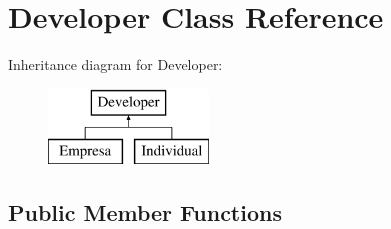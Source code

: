 \hypertarget{class_developer}{\section{Developer Class Reference}
\label{class_developer}
}
Inheritance diagram for Developer\+:\begin{figure}[H]
\begin{center}
\leavevmode
\includegraphics[height=2.000000cm]{class_developer}
\end{center}
\end{figure}
\subsection*{Public Member Functions}
